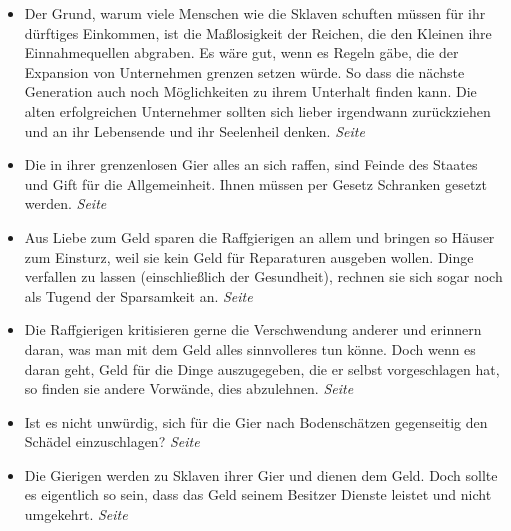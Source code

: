 \begin{itemize}
\begin{itemize}
 \item Der Grund, warum viele Menschen wie die Sklaven schuften müssen für ihr
dürftiges Einkommen, ist die Maßlosigkeit der Reichen, die den Kleinen ihre
Einnahmequellen abgraben. Es wäre gut, wenn es Regeln gäbe, die der Expansion
von Unternehmen grenzen setzen würde. So dass die nächste Generation
auch noch Möglichkeiten zu ihrem Unterhalt finden kann. Die alten
erfolgreichen Unternehmer sollten sich lieber irgendwann zurückziehen und an
ihr Lebensende und ihr Seelenheil denken.
 \dotfill \textit{Seite~\pageref{ref:13_08_reichtum_sklaverei}}\\

 \item Die in ihrer grenzenlosen Gier alles an sich raffen, sind Feinde des
Staates und Gift für die Allgemeinheit. Ihnen müssen per Gesetz Schranken gesetzt
werden.
 \dotfill \textit{Seite~\pageref{ref:13_14_reichtum_schaden}}\\

 \item Aus Liebe zum Geld sparen die Raffgierigen an allem und bringen so
Häuser zum Einsturz, weil sie kein Geld für Reparaturen ausgeben wollen. Dinge
verfallen zu lassen (einschließlich der Gesundheit), rechnen sie sich sogar
noch als Tugend der Sparsamkeit an.
 \dotfill \textit{Seite~\pageref{ref:13_14_reichtum_einsturz}}\\

 \item Die Raffgierigen kritisieren gerne die Verschwendung anderer und
 erinnern daran, was man mit dem Geld alles sinnvolleres tun könne. Doch
 wenn es daran geht, Geld für die Dinge auszugegeben, die er selbst vorgeschlagen
 hat, so finden sie andere Vorwände, dies abzulehnen.
 \dotfill \textit{Seite~\pageref{ref:13_15_Kapitalisten_kritik}}\\

 \item Ist es nicht unwürdig, sich für die Gier nach Bodenschätzen
gegenseitig den Schädel einzuschlagen?
 \dotfill \textit{Seite~\pageref{ref:13_21_Kapitalisten_kritik}}\\

 \item Die Gierigen werden zu Sklaven ihrer Gier und dienen dem Geld. Doch
 sollte es eigentlich so sein, dass das Geld seinem Besitzer Dienste leistet und nicht umgekehrt.
 \dotfill \textit{Seite~\pageref{ref:13_21_Kapitalisten_dienerschaft}}\\


\end{itemize}
\end{itemize}
